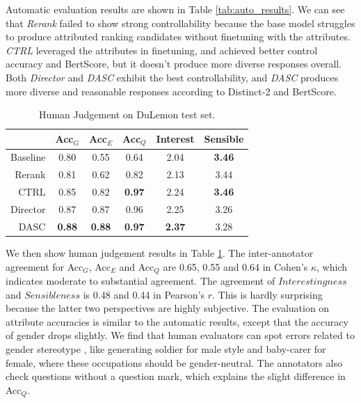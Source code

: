Automatic evaluation results are shown in Table \ref{tab:auto_results}. We can see that \textit{Rerank} failed to show strong controllability because the base model struggles to produce attributed ranking candidates without finetuning with the attributes. \textit{CTRL} leveraged the attributes in finetuning, and achieved better control accuracy and BertScore, but it doesn't produce more diverse responses overall. Both \textit{Director} and \textit{DASC} exhibit the best controllability, and \textit{DASC} produces more diverse and reasonable responses according to Distinct-2 and BertScore. 

\begin{table}[th]
    \small
    \centering
    \begin{tabular}{rccccc}
    \hline
                & Acc$_G$       & Acc$_E$       & Acc$_Q$  & Interest      & Sensible      \\ \hline
    Baseline & 0.80          & 0.55          & 0.64          & 2.04          & \textbf{3.46} \\
    Rerank   & 0.81          & 0.62          & 0.82          & 2.13          & 3.44          \\
    CTRL     & 0.85          & 0.82          & \textbf{0.97} & 2.24          & \textbf{3.46} \\
    Director & 0.87          & 0.87          & 0.96          & 2.25 & 3.26 \\
    DASC     & \textbf{0.88} & \textbf{0.88} & \textbf{0.97} & \textbf{2.37} & 3.28 \\ \hline
    \end{tabular}
    \caption{Human Judgement on DuLemon test set.}
    \label{tab:human_results}
\end{table}

We then show human judgement results in Table \ref{tab:human_results}. The inter-annotator agreement for Acc$_G$, Acc$_E$ and Acc$_Q$ are 0.65, 0.55 and 0.64 in Cohen's $\kappa$, which indicates moderate to substantial agreement. The agreement of $Interestingness$ and $Sensibleness$ is 0.48 and 0.44 in Pearson's $r$. This is hardly
surprising because the latter two perspectives are highly subjective. 
The evaluation on attribute accuracies is similar to the automatic results, 
except that the accuracy of gender drops slightly. We find that human evaluators can spot errors related to gender stereotype \citep{bolukbasi2016man}, like generating soldier for male style and baby-carer for female, where these occupations should be gender-neutral. The annotators also check questions 
without a question mark, which explains the slight difference in Acc$_Q$.

